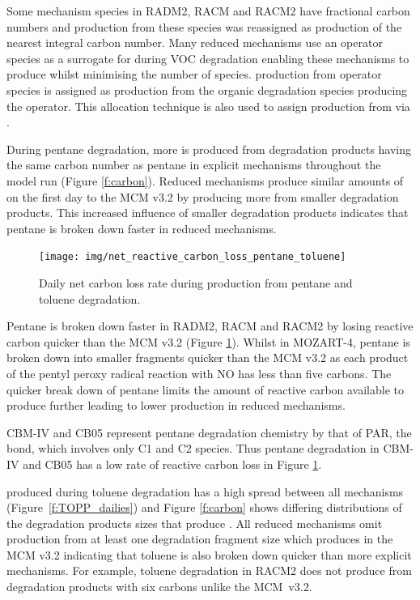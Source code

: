 Some mechanism species in RADM2, RACM and RACM2 have fractional carbon numbers \citep{Stockwell:1990, Stockwell:1997, Goliff:2013} and  production from these species was reassigned as  production of the nearest integral carbon number.  
Many reduced mechanisms use an operator species as a surrogate for  during VOC degradation enabling these mechanisms to produce  whilst minimising the number of  species.
 production from operator species is assigned as  production from the organic degradation species producing the operator.
This allocation technique is also used to assign  production from  via .

During pentane degradation, more  is produced from degradation products having the same carbon number as pentane in explicit mechanisms throughout the model run (Figure \ref{f:carbon}).
Reduced mechanisms produce similar amounts of  on the first day to the MCM v3.2 by producing more  from smaller degradation products.
This increased influence of smaller degradation products indicates that pentane is broken down faster in reduced mechanisms.

\begin{figure}
    \centering
    \texttt{[image: img/net\_reactive\_carbon\_loss\_pentane\_toluene]}
    \vspace{0mm}
    \caption{Daily net carbon loss rate during  production from pentane and toluene degradation.}
    \vspace{-4mm}
    \label{f:net_carbon_loss}
\end{figure}

Pentane is broken down faster in RADM2, RACM and RACM2 by losing reactive carbon quicker than the MCM v3.2 (Figure \ref{f:net_carbon_loss}).
Whilst in MOZART-4, pentane is broken down into smaller fragments quicker than the MCM v3.2 as each product of the pentyl peroxy radical reaction with NO has less than five carbons.
The quicker break down of pentane limits the amount of reactive carbon available to produce further  leading to lower  production in reduced mechanisms.

CBM-IV and CB05 represent pentane degradation chemistry by that of PAR, the  bond, which involves only C1 and C2 species.
Thus pentane degradation in CBM-IV and CB05 has a low rate of reactive carbon loss in Figure \ref{f:net_carbon_loss}.

 produced during toluene degradation has a high spread between all mechanisms \mbox{(Figure \ref{f:TOPP_dailies})} and Figure \ref{f:carbon} shows differing distributions of the degradation products sizes that produce .
All reduced mechanisms omit  production from at least one degradation fragment size which produces  in the MCM v3.2 indicating that toluene is also broken down quicker than more explicit mechanisms.
For example, toluene degradation in RACM2 does not produce  from degradation products with six carbons unlike the \mbox{MCM v3.2}.

